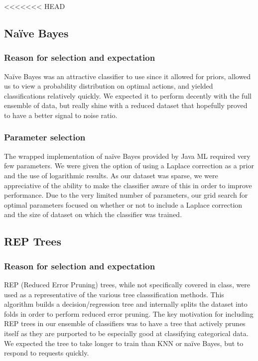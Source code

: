 \documentclass[]{article}   %
\begin{document}
<<<<<<< HEAD
\subsection{Na\"{i}ve Bayes}
\subsubsection{Reason for selection and expectation}
Na\"{i}ve Bayes was an attractive classifier to use since it allowed for priors, allowed us to view a probability distribution on optimal actions, and yielded classifications relatively quickly. We expected it to perform decently with the full ensemble of data, but really shine with a reduced dataset that hopefully proved to have a better signal to noise ratio. 

\subsubsection{Parameter selection}
The wrapped implementation of na\"{i}ve Bayes provided by Java ML required very few parameters. We were given the option of using a Laplace correction as a prior and the use of logarithmic results. As our dataset was sparse, we were appreciative of the ability to make the classifier aware of this in order to improve performance. Due to the very limited number of parameters, our grid search for optimal parameters focused on whether or not to include a Laplace correction and the size of dataset on which the classifier was trained. 

\subsection{REP Trees}
\subsubsection{Reason for selection and expectation}
REP (Reduced Error Pruning) trees, while not specifically covered in class, were used as a representative of the various tree classsification methods. This algorithm builds a decision/regression tree and internally splits the dataset into folds in order to perform reduced error pruning. The key motivation for including REP trees in our ensemble of classifiers was to have a tree that actively prunes itself as they are purported to be especially good at classifying categorical data. We expected the tree to take longer to train than KNN or na\"{i}ve Bayes, but to respond to requests quickly.
\end{document}
